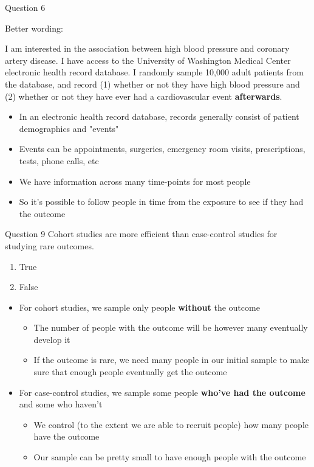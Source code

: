 \documentclass[10pt,t]{beamer}
\begin{document}
\begin{frame}{Question 6}
	\vspace{-5 mm}
	
	Better wording:
	\medskip
	
	I am interested in the association between high blood pressure and coronary artery disease. I have access to the University of Washington Medical Center electronic health record database. I randomly sample 10,000 adult patients from the database, and record (1) whether or not they have high blood pressure and (2) whether or not they have ever had a cardiovascular event \textbf{afterwards}. 
	\medskip
	

	\begin{itemize}
		\item In an electronic health record database, records generally consist of patient demographics and "events"
		\medskip
		\item Events can be appointments, surgeries, emergency room visits, prescriptions, tests, phone calls, etc
		\medskip
		\item We have information across many time-points for most people
		\medskip
		\item So it's possible to follow people in time from the exposure to see if they had the outcome
	\end{itemize}
	
\end{frame}

\begin{frame}{Question 9}
	Cohort studies are more efficient than case-control studies for studying rare outcomes. 
	
	\smallskip
	\begin{enumerate}
		\item True
		\item {\color{green}False}
	\end{enumerate}
	
	\medskip
	
	\begin{itemize}
		\item For cohort studies, we sample only people \textbf{without} the outcome
		\medskip
		\begin{itemize}
			\item The number of people with the outcome will be however many eventually develop it
			\smallskip
			\item If the outcome is rare, we need many people in our initial sample to make sure that enough people eventually get the outcome
		\end{itemize}
	\medskip
		\item  For case-control studies, we sample some people \textbf{who've had the outcome} and some who haven't
		\medskip
			\begin{itemize}
			\item We control (to the extent we are able to recruit people) how many people have the outcome
			\smallskip
			\item Our sample can be pretty small to have enough people with the outcome
		\end{itemize}
	\end{itemize}
\end{frame}
\end{document}
